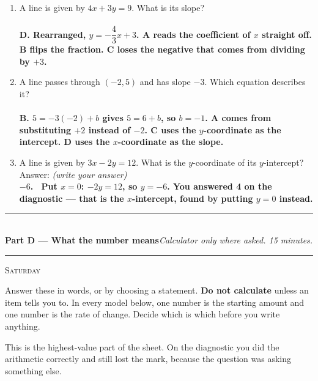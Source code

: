 \documentclass[11pt,a4paper]{article}
\newif\ifANSWERS
\newcommand{\PartHead}[2]{%
  \vspace{6pt}
  {\color{navy}\rule{\textwidth}{0.8pt}}\\[2pt]
  {\large\bfseries\color{navy}#1}\hfill{\small\itshape #2}\\[-4pt]
  {\color{navy}\rule{\textwidth}{0.4pt}}
  \vspace{4pt}
}
\newcommand{\sitting}[1]{{\footnotesize\textsc{\color{navy}#1}}\par\vspace{2pt}}
\newcommand{\spr}{\\[3pt]\hspace*{6pt}Answer: \underline{\hspace{3.2cm}}\hfill{\footnotesize\itshape(write your answer)}}
\newcommand{\ans}[1]{\ {\color{keyred}\bfseries #1}}
\newcommand{\ans}[1]{}
\begin{document}
\begin{enumerate}[leftmargin=20pt,itemsep=9pt]
\item A line is given by $4x+3y=9$. What is its slope?\\
  \ans{\\ D. Rearranged, $y=-\dfrac{4}{3}x+3$. A reads the coefficient of $x$ straight
  off. B flips the fraction. C loses the negative that comes from dividing by $+3$.}

\item A line passes through $(-2,5)$ and has slope $-3$. Which equation describes it?\\
  \ans{\\ B. $5=-3(-2)+b$ gives $5=6+b$, so $b=-1$. A comes from substituting $+2$
  instead of $-2$. C uses the $y$-coordinate as the intercept. D uses the
  $x$-coordinate as the slope.}

\item A line is given by $3x-2y=12$. What is the $y$-coordinate of its $y$-intercept? \spr
  \ans{\\ $-6$. \ Put $x=0$: $-2y=12$, so $y=-6$. You answered 4 on the diagnostic ---
  that is the $x$-intercept, found by putting $y=0$ instead.}
\end{enumerate}

\ifANSWERS\else\newpage\fi
\PartHead{Part D --- What the number means}{Calculator only where asked. 15 minutes.}
\sitting{Saturday}
Answer these in words, or by choosing a statement. \textbf{Do not calculate} unless an
item tells you to. In every model below, one number is the starting amount and one
number is the rate of change. Decide which is which before you write anything.

This is the highest-value part of the sheet. On the diagnostic you did the arithmetic
correctly and still lost the mark, because the question was asking something else.
\end{document}
